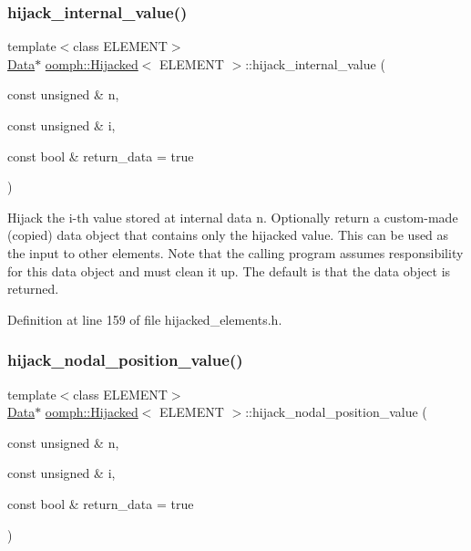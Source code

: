 \subsubsection{\texorpdfstring{hijack\+\_\+internal\+\_\+value()}{hijack\_internal\_value()}}
{\footnotesize\ttfamily template$<$class E\+L\+E\+M\+E\+NT$>$ \\
\hyperlink{classoomph_1_1Data}{Data}$\ast$ \hyperlink{classoomph_1_1Hijacked}{oomph\+::\+Hijacked}$<$ E\+L\+E\+M\+E\+NT $>$\+::hijack\+\_\+internal\+\_\+value (\begin{DoxyParamCaption}\item[{const unsigned \&}]{n,  }\item[{const unsigned \&}]{i,  }\item[{const bool \&}]{return\+\_\+data = {\ttfamily true} }\end{DoxyParamCaption})\hspace{0.3cm}{\ttfamily [inline]}}



Hijack the i-\/th value stored at internal data n. Optionally return a custom-\/made (copied) data object that contains only the hijacked value. This can be used as the input to other elements. Note that the calling program assumes responsibility for this data object and must clean it up. The default is that the data object is returned. 



Definition at line 159 of file hijacked\+\_\+elements.\+h.

\mbox{\label{classoomph_1_1Hijacked_a3c4a0ed281996d74c30f5d4af9a5a324}} 
\subsubsection{\texorpdfstring{hijack\+\_\+nodal\+\_\+position\+\_\+value()}{hijack\_nodal\_position\_value()}}
{\footnotesize\ttfamily template$<$class E\+L\+E\+M\+E\+NT$>$ \\
\hyperlink{classoomph_1_1Data}{Data}$\ast$ \hyperlink{classoomph_1_1Hijacked}{oomph\+::\+Hijacked}$<$ E\+L\+E\+M\+E\+NT $>$\+::hijack\+\_\+nodal\+\_\+position\+\_\+value (\begin{DoxyParamCaption}\item[{const unsigned \&}]{n,  }\item[{const unsigned \&}]{i,  }\item[{const bool \&}]{return\+\_\+data = {\ttfamily true} }\end{DoxyParamCaption})\hspace{0.3cm}{\ttfamily [inline]}}



